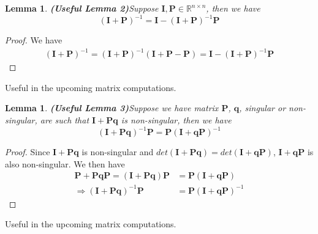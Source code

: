 \documentclass[13pt]{article}
\newtheorem{lemma}[theorem]{Lemma}
\theoremstyle{definition}
\theoremstyle{remark}
\newenvironment{remark}
  {\pushQED{\qed}\renewcommand{\qedsymbol}{$\triangle$}\remarkx}
  {\popQED\endremarkx}
\begin{document}
\begin{lemma} \textbf{(Useful Lemma 2)}\label{lemma:inverse matrix sum 2}
Suppose $\mathbf{\mathbf{I}}, \mathbf{\mathbf{P}}\in \mathbb{R}^{n\times n}$, then we have
\[
(\mathbf{\mathbf{I}}+\mathbf{\mathbf{P}})^{-1} = \mathbf{\mathbf{I}}-(\mathbf{\mathbf{I}}+\mathbf{\mathbf{P}})^{-1}\mathbf{\mathbf{P}}
\]
\end{lemma}
\begin{proof}
    We have
    \begin{align*}
        (\mathbf{\mathbf{I}}+\mathbf{\mathbf{P}})^{-1} = (\mathbf{\mathbf{I}}+\mathbf{\mathbf{P}})^{-1}(\mathbf{\mathbf{I}}+\mathbf{\mathbf{P}}-\mathbf{\mathbf{P}})=\mathbf{\mathbf{I}}-(\mathbf{\mathbf{I}}+\mathbf{\mathbf{P}})^{-1}\mathbf{\mathbf{P}}
    \end{align*}
\end{proof}
\begin{remark}
    Useful in the upcoming matrix computations.
\end{remark}

\begin{lemma} \textbf{(Useful Lemma 3)}\label{lemma:inverse matrix sum 3}
Suppose we have matrix $\mathbf{\mathbf{P}}$, $\bm{q}$, singular or non-singular, are such that $\mathbf{\mathbf{I}}+ \mathbf{\mathbf{P}}\bm{q}$ is non-singular, then we have
\[
(\mathbf{\mathbf{I}}+\mathbf{\mathbf{P}}\bm{q})^{-1}\mathbf{\mathbf{P}} = \mathbf{\mathbf{P}}(\mathbf{\mathbf{I}}+\bm{q}\mathbf{\mathbf{P}})^{-1}
\]
\end{lemma}
\begin{proof}
    Since $\mathbf{\mathbf{I}}+ \mathbf{\mathbf{P}}\bm{q}$ is non-singular and $det(\mathbf{\mathbf{I}}+ \mathbf{\mathbf{P}}\bm{q})= det(\mathbf{\mathbf{I}}+ \bm{q}\mathbf{\mathbf{P}})$,  $\mathbf{\mathbf{I}}+ \bm{q}\mathbf{\mathbf{P}}$ is also non-singular. We then have
    \begin{align*}
        \mathbf{\mathbf{P}}+ \mathbf{\mathbf{P}}\bm{q}\mathbf{\mathbf{P}}=(\mathbf{\mathbf{I}}+ \mathbf{\mathbf{P}}\bm{q})\mathbf{\mathbf{P}} &= \mathbf{\mathbf{P}}(\mathbf{\mathbf{I}}+\bm{q}\mathbf{\mathbf{P}})\\
        \Longrightarrow (\mathbf{\mathbf{I}}+\mathbf{\mathbf{P}}\bm{q})^{-1}\mathbf{\mathbf{P}} &= \mathbf{\mathbf{P}}(\mathbf{\mathbf{I}}+\bm{q}\mathbf{\mathbf{P}})^{-1}
    \end{align*}
\end{proof}
\begin{remark}
    Useful in the upcoming matrix computations.
\end{remark}
\end{document}
